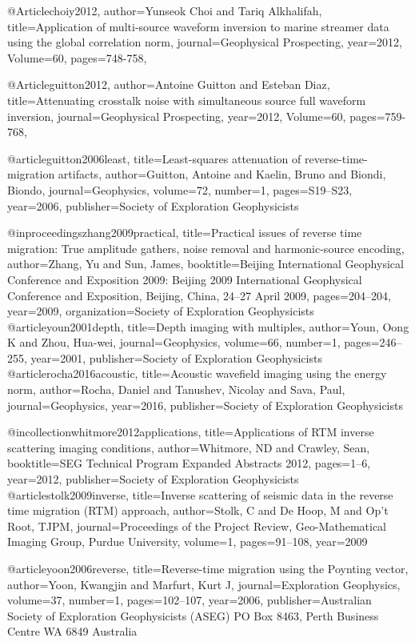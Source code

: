 @Article{choiy2012,
  author={Yunseok Choi and Tariq Alkhalifah},
  title={Application of multi-source waveform inversion to marine streamer data using the global correlation norm},
  journal={Geophysical Prospecting},
  year=2012,
  Volume=60,
  pages={748-758},
}


@Article{guitton2012,
  author={Antoine Guitton and Esteban Diaz},
  title={Attenuating crosstalk noise with simultaneous source full waveform inversion},
  journal={Geophysical Prospecting},
  year=2012,
  Volume=60,
  pages={759-768},
}

@article{guitton2006least,
  title={Least-squares attenuation of reverse-time-migration artifacts},
  author={Guitton, Antoine and Kaelin, Bruno and Biondi, Biondo},
  journal={Geophysics},
  volume={72},
  number={1},
  pages={S19--S23},
  year={2006},
  publisher={Society of Exploration Geophysicists}
}

@inproceedings{zhang2009practical,
  title={Practical issues of reverse time migration: True amplitude gathers, noise removal and harmonic-source encoding},
  author={Zhang, Yu and Sun, James},
  booktitle={Beijing International Geophysical Conference and Exposition 2009: Beijing 2009 International Geophysical Conference and Exposition, Beijing, China, 24--27 April 2009},
  pages={204--204},
  year={2009},
  organization={Society of Exploration Geophysicists}
}
@article{youn2001depth,
  title={Depth imaging with multiples},
  author={Youn, Oong K and Zhou, Hua-wei},
  journal={Geophysics},
  volume={66},
  number={1},
  pages={246--255},
  year={2001},
  publisher={Society of Exploration Geophysicists}
}
@article{rocha2016acoustic,
  title={Acoustic wavefield imaging using the energy norm},
  author={Rocha, Daniel and Tanushev, Nicolay and Sava, Paul},
  journal={Geophysics},
  year={2016},
  publisher={Society of Exploration Geophysicists}
}

@incollection{whitmore2012applications,
  title={Applications of RTM inverse scattering imaging conditions},
  author={Whitmore, ND and Crawley, Sean},
  booktitle={SEG Technical Program Expanded Abstracts 2012},
  pages={1--6},
  year={2012},
  publisher={Society of Exploration Geophysicists}
}
@article{stolk2009inverse,
  title={Inverse scattering of seismic data in the reverse time migration (RTM) approach},
  author={Stolk, C and De Hoop, M and Op’t Root, TJPM},
  journal={Proceedings of the Project Review, Geo-Mathematical Imaging Group, Purdue University},
  volume={1},
  pages={91--108},
  year={2009}
}

@article{yoon2006reverse,
  title={Reverse-time migration using the Poynting vector},
  author={Yoon, Kwangjin and Marfurt, Kurt J},
  journal={Exploration Geophysics},
  volume={37},
  number={1},
  pages={102--107},
  year={2006},
  publisher={Australian Society of Exploration Geophysicists (ASEG) PO Box 8463, Perth Business Centre WA 6849 Australia}
}

